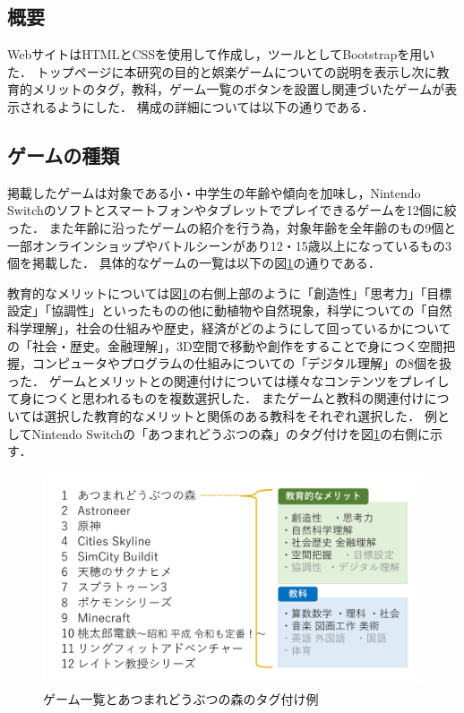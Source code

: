 \documentclass[12pt,a4j,titlepage]{ltjsarticle}
\begin{document}
\subsection{概要}
WebサイトはHTMLとCSSを使用して作成し，ツールとしてBootstrapを用いた．
トップページに本研究の目的と娯楽ゲームについての説明を表示し次に教育的メリットのタグ，教科，ゲーム一覧のボタンを設置し関連づいたゲームが表示されるようにした．
構成の詳細については以下の通りである．

\subsection{ゲームの種類}
掲載したゲームは対象である小・中学生の年齢や傾向を加味し，Nintendo Switchのソフトとスマートフォンやタブレットでプレイできるゲームを12個に絞った．
また年齢に沿ったゲームの紹介を行う為，対象年齢を全年齢のもの9個と一部オンラインショップやバトルシーンがあり12・15歳以上になっているもの3個を掲載した．
具体的なゲームの一覧は以下の図\ref{fig:ゲーム一覧}の通りである．

教育的なメリットについては図\ref{fig:ゲーム一覧}の右側上部のように「創造性」「思考力」「目標設定」「協調性」といったものの他に動植物や自然現象，科学についての「自然科学理解」，社会の仕組みや歴史，経済がどのようにして回っているかについての「社会・歴史。金融理解」，3D空間で移動や創作をすることで身につく空間把握，コンピュータやプログラムの仕組みについての「デジタル理解」の8個を扱った．
ゲームとメリットとの関連付けについては様々なコンテンツをプレイして身につくと思われるものを複数選択した．
またゲームと教科の関連付けについては選択した教育的なメリットと関係のある教科をそれぞれ選択した．
例としてNintendo Switchの「あつまれどうぶつの森」のタグ付けを図\ref{fig:ゲーム一覧}の右側に示す．

\vspace{1zh}
\begin{figure}[H]
\begin{center}
 \includegraphics[keepaspectratio, scale=0.35]{games.pdf}
\end{center}
 \caption{ゲーム一覧とあつまれどうぶつの森のタグ付け例}
 \label{fig:ゲーム一覧}
\end{figure}
\end{document}
